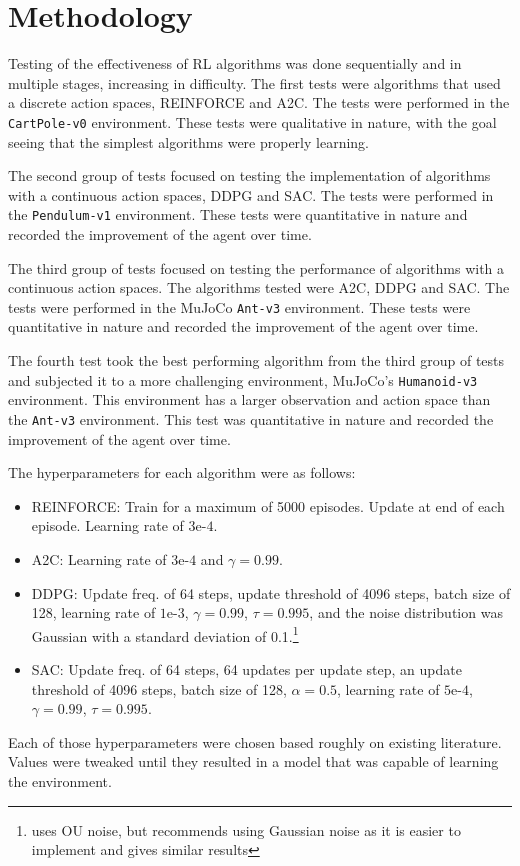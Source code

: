 \documentclass[conference]{IEEEtran}
\newcommand{\size}[2]{{\fontsize{#1}{0}\selectfont#2}}
\newcommand{\code}[1]{\colorbox{light-gray}{\size{8}{\texttt{#1}}}}
\begin{document}
\section{Methodology}

Testing of the effectiveness of RL algorithms was done sequentially and in multiple stages, increasing in difficulty. The first tests were algorithms that used a discrete action spaces, REINFORCE and A2C. The tests were performed in the \code{CartPole-v0} environment. These tests were qualitative in nature, with the goal seeing that the simplest algorithms were properly learning.

The second group of tests focused on testing the implementation of algorithms with a continuous action spaces, DDPG and SAC. The tests were performed in the \code{Pendulum-v1} environment. These tests were quantitative in nature and recorded the improvement of the agent over time.

The third group of tests focused on testing the performance of algorithms with a continuous action spaces. The algorithms tested were A2C, DDPG and SAC. The tests were performed in the MuJoCo \code{Ant-v3} environment. These tests were quantitative in nature and recorded the improvement of the agent over time.

The fourth test took the best performing algorithm from the third group of tests and subjected it to a more challenging environment, MuJoCo's \code{Humanoid-v3} environment. This environment has a larger observation and action space than the \code{Ant-v3} environment. This test was quantitative in nature and recorded the improvement of the agent over time.


The hyperparameters for each algorithm were as follows:
\begin{itemize}
    \item REINFORCE: Train for a maximum of 5000 episodes. Update at end of each episode. Learning rate of $3\text{e-}4$.
    \item A2C: Learning rate of $3\text{e-}4$ and $\gamma = 0.99$.
    \item DDPG: Update freq. of 64 steps, update threshold of 4096 steps, batch size of 128, learning rate of $1\text{e-}3$, $\gamma = 0.99$, $\tau = 0.995$, and the noise distribution was Gaussian with a standard deviation of 0.1.\footnote{\cite{DDPG} uses OU noise, but \cite{spinning_up_ddpg} recommends using Gaussian noise as it is easier to implement and gives similar results}
    \item SAC: Update freq. of 64 steps, 64 updates per update step, an update threshold of 4096 steps, batch size of 128, $\alpha = 0.5$, learning rate of $5\text{e-}4$, $\gamma = 0.99$, $\tau = 0.995$.
\end{itemize}
Each of those hyperparameters were chosen based roughly on existing literature. Values were tweaked until they resulted in a model that was capable of learning the environment.
\end{document}
